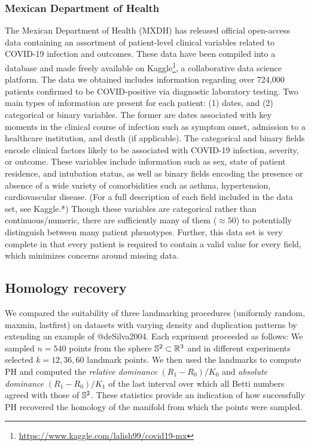 \documentclass[
]{article}
\begin{document}
\hypertarget{mexican-department-of-health}{%
\subsubsection{Mexican Department of
Health}\label{mexican-department-of-health}}

The Mexican Department of Health (MXDH) has released official
open-access data containing an assortment of patient-level clinical
variables related to COVID-19 infection and outcomes. These data have
been compiled into a database and made freely available on
Kaggle\footnote{\url{https://www.kaggle.com/lalish99/covid19-mx}}, a
collaborative data science platform. The data we obtained includes
information regarding over 724,000 patients confirmed to be
COVID-positive via diagnostic laboratory testing. Two main types of
information are present for each patient: (1) dates, and (2) categorical
or binary variables. The former are dates associated with key moments in
the clinical course of infection such as symptom onset, admission to a
healthcare institution, and death (if applicable). The categorical and
binary fields encode clinical factors likely to be associated with
COVID-19 infection, severity, or outcome. These variables include
information such as sex, state of patient residence, and intubation
status, as well as binary fields encoding the presence or absence of a
wide variety of comorbidities such as asthma, hypertension,
cardiovascular disease. (For a full description of each field included
in the data set, see Kaggle.*) Though these variables are categorical
rather than continuous/numeric, there are sufficiently many of them
(\(\approx 50\)) to potentially distinguish between many patient
phenotypes. Further, this data set is very complete in that every
patient is required to contain a valid value for every field, which
minimizes concerns around missing data.

\hypertarget{homology-recovery}{%
\subsection{Homology recovery}\label{homology-recovery}}

We compared the suitability of three landmarking procedures (uniformly
random, maxmin, lastfirst) on datasets with varying density and
duplication patterns by extending an example of @deSilva2004. Each
expriment proceeded as follows: We sampled \(n=540\) points from the
sphere \(\mathbb{S}^2\subset\mathbb{R}^3\) and in different experiments selected
\(k=12,36,60\) landmark points. We then used the landmarks to compute PH
and computed the \emph{relative dominance} \((R_1 - R_0) / K_0\) and
\emph{absolute dominance} \((R_1 - R_0) / K_1\) of the last interval
over which all Betti numbers agreed with those of \(\mathbb{S}^2\). These
statistics provide an indication of how successfully PH recovered the
homology of the manifold from which the points were sampled.
\end{document}
